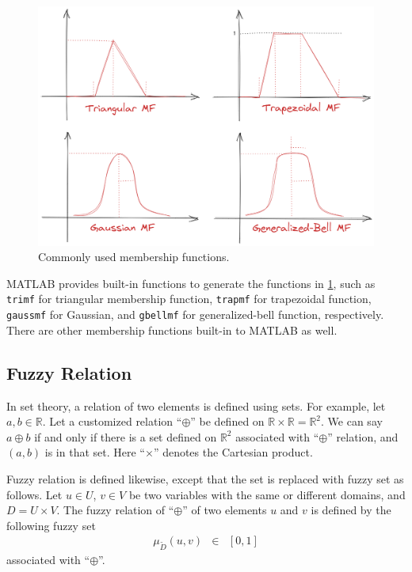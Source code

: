 \begin{figure}
	\centering
	\includegraphics[width=350pt]{chapters/ch-fuzzy-control-system/figures/commonmf.png}
	\caption{Commonly used membership functions.} \label{ch:fcs:fig:commonmf}
\end{figure}

MATLAB provides built-in functions to generate the functions in \ref{ch:fcs:fig:commonmf}, such as \verb|trimf| for triangular membership function, \verb|trapmf| for trapezoidal function, \verb|gaussmf| for Gaussian, and \verb|gbellmf| for generalized-bell function, respectively. There are other membership functions built-in to MATLAB as well.

\subsection{Fuzzy Relation}

In set theory, a relation of two elements is defined using sets. For example, let $a, b \in \mathbb{R}$. Let a customized relation ``$\oplus$'' be defined on $\mathbb{R} \times \mathbb{R} = \mathbb{R}^2$. We can say $a \oplus b$ if and only if there is a set defined on $\mathbb{R}^2$ associated with ``$\oplus$'' relation, and $(a,b)$ is in that set. Here ``$\times$'' denotes the Cartesian product.

Fuzzy relation is defined likewise, except that the set is replaced with fuzzy set as follows. Let $u\in U$, $v \in V$ be two variables with the same or different domains, and $D=U \times V$. The fuzzy relation of ``$\oplus$'' of two elements $u$ and $v$ is defined by the following fuzzy set
\begin{eqnarray}
	\mu_{\utilde{D}} (u,v) &\in& [0, 1] \nonumber
\end{eqnarray}
associated with ``$\oplus$''.

